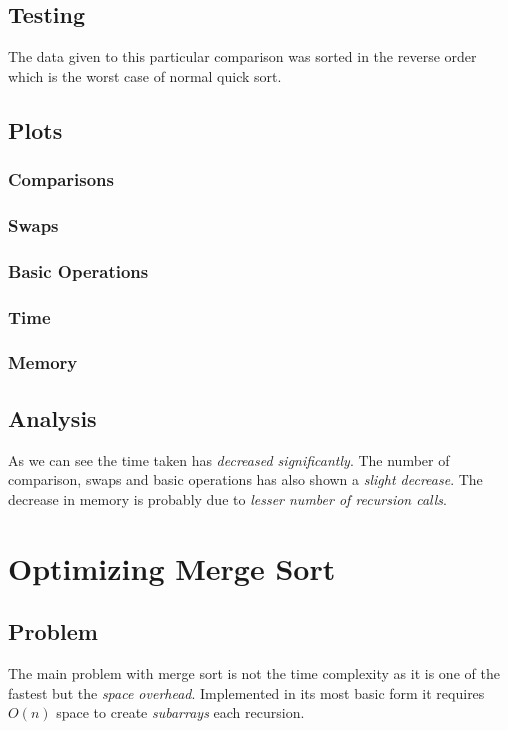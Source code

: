 \documentclass[12pt]{article}
\begin{document}
\subsection{Testing}
The data given to this particular comparison was sorted in the reverse order
which is the worst case of normal quick sort.
\subsection{Plots}
\subsubsection{Comparisons}

\subsubsection{Swaps}

\subsubsection{Basic Operations}

\subsubsection{Time}

\subsubsection{Memory}

\subsection{Analysis}
As we can see the time taken has \textit{decreased significantly}.
The number of comparison, swaps and basic operations has also shown a
\textit{slight decrease}. The decrease in memory is probably due to
\textit{lesser number of recursion calls}.
\section{Optimizing Merge Sort}
\subsection{Problem}
The main problem with merge sort is not the time complexity as it is one of the
fastest but the \textit{space overhead}. Implemented in its most basic form
it requires $O(n)$ space to create \textit{subarrays} each recursion.
\end{document}
